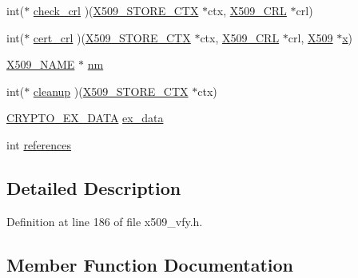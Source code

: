 \begin{DoxyCompactItemize}
\item 
int($\ast$ \hyperlink{structx509__store__st_a8ff691bb54a96abfec0395cc3c18af64}{check\+\_\+crl} )(\hyperlink{crypto_2ossl__typ_8h_ae681945a2cf88d6337137dc0260a1545}{X509\+\_\+\+S\+T\+O\+R\+E\+\_\+\+C\+TX} $\ast$ctx, \hyperlink{crypto_2ossl__typ_8h_ac8661d2485c2c8da5fd7dd26b846f4bf}{X509\+\_\+\+C\+RL} $\ast$crl)
\item 
int($\ast$ \hyperlink{structx509__store__st_a14154457f88578e298eae33987207ff0}{cert\+\_\+crl} )(\hyperlink{crypto_2ossl__typ_8h_ae681945a2cf88d6337137dc0260a1545}{X509\+\_\+\+S\+T\+O\+R\+E\+\_\+\+C\+TX} $\ast$ctx, \hyperlink{crypto_2ossl__typ_8h_ac8661d2485c2c8da5fd7dd26b846f4bf}{X509\+\_\+\+C\+RL} $\ast$crl, \hyperlink{crypto_2ossl__typ_8h_a4f666bde6518f95deb3050c54b408416}{X509} $\ast$\hyperlink{include_2openssl_2pem_8h_a97dc7cf0c4554cbe9a4b58bfe9a749f5}{x})
\item 
\hyperlink{crypto_2ossl__typ_8h_a5c5fc036757e87b9bd163d0221696533}{X509\+\_\+\+N\+A\+ME} $\ast$ \hyperlink{structx509__store__st_a57a3541601842982e910946c748942ca}{nm}
\item 
int($\ast$ \hyperlink{structx509__store__st_a03a57d8a8f4971f2c51d152996d5a986}{cleanup} )(\hyperlink{crypto_2ossl__typ_8h_ae681945a2cf88d6337137dc0260a1545}{X509\+\_\+\+S\+T\+O\+R\+E\+\_\+\+C\+TX} $\ast$ctx)
\item 
\hyperlink{crypto_2ossl__typ_8h_a7eaff1c18057495d8af18f22d1370b51}{C\+R\+Y\+P\+T\+O\+\_\+\+E\+X\+\_\+\+D\+A\+TA} \hyperlink{structx509__store__st_ac3e4fd59d6ee44a81f3a58114613c1e2}{ex\+\_\+data}
\item 
int \hyperlink{structx509__store__st_a146fdb34d9a909e530adf8b189481195}{references}
\end{DoxyCompactItemize}


\subsection{Detailed Description}


Definition at line 186 of file x509\+\_\+vfy.\+h.



\subsection{Member Function Documentation}
